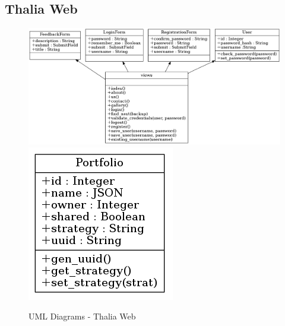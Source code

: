 \documentclass[main.tex]{subfiles}
\begin{document}
\subsection{Thalia Web}

\begin{figure}[H]
   \centering
   \includegraphics[width=\textwidth,keepaspectratio]{Report/08Appendices/084UML/084Pictures/classes_thalia_1.png}
   \includegraphics[scale=2.0,keepaspectratio]{Report/08Appendices/084UML/084Pictures/classes_thalia_2.png}
   \caption{UML Diagrams - Thalia Web}
\end{figure}
\end{document}
